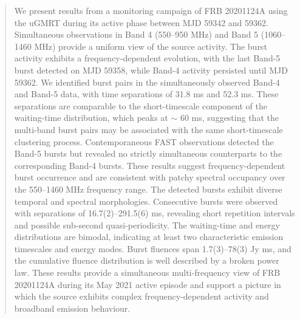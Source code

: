 \documentclass[preprint2, trackchanges]{aastex631}
\begin{document}
\begin{abstract}
We present results from a monitoring campaign of FRB 20201124A using the uGMRT during its active phase between MJD 59342 and 59362. Simultaneous observations in Band 4 (550--950 MHz) and Band 5 (1060--1460 MHz) provide a uniform view of the source activity. The burst activity exhibits a frequency-dependent evolution, with the last Band-5 burst detected on MJD 59358, while Band-4 activity persisted until MJD 59362. We identified burst pairs in the simultaneously observed Band-4 and Band-5 data, with time separations of 31.8 ms and 52.3 ms. These separations are comparable to the short-timescale component of the waiting-time distribution, which peaks at $\sim$ 60 ms, suggesting that the multi-band burst pairs may be associated with the same short-timescale clustering process. Contemporaneous FAST observations detected the Band-5 bursts but revealed no strictly simultaneous counterparts to the corresponding Band-4 bursts. These results suggest frequency-dependent burst occurrence and are consistent with patchy spectral occupancy over the 550--1460 MHz frequency range. The detected bursts exhibit diverse temporal and spectral morphologies. Consecutive bursts were observed with separations of 16.7(2)--291.5(6) ms, revealing short repetition intervals and possible sub-second quasi-periodicity. The waiting-time and energy distributions are bimodal, indicating at least two characteristic emission timescales and energy modes. Burst fluences span 1.7(3)--78(3) Jy ms, and the cumulative fluence distribution is well described by a broken power law. These results provide a simultaneous multi-frequency view of FRB 20201124A during its May 2021 active episode and support a picture in which the source exhibits complex frequency-dependent activity and broadband emission behaviour.

\end{abstract}
\end{document}
